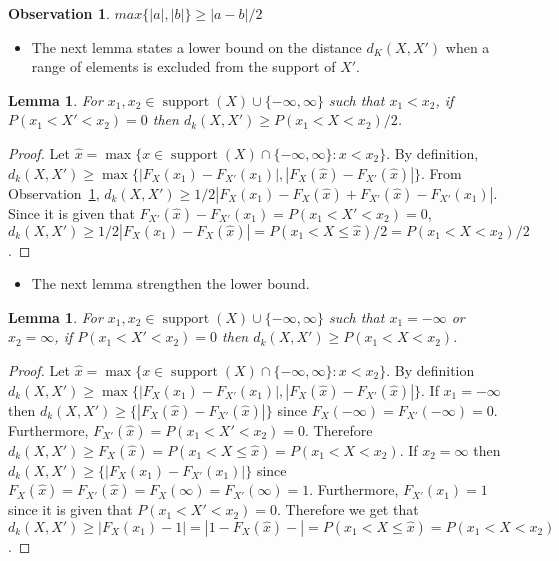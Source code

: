 \documentclass{article}
\newtheorem{lemma}[thm]{Lemma}
\newtheorem{observation}[thm]{Observation}
\DeclareMathOperator{\support}{support}
\begin{document}
\begin{observation}\label{obs:ab}
	$max\{|a|,|b|\} \geq |a-b|/2$
\end{observation}

\begin{itemize}
	\item The next lemma states a lower bound on the distance $d_K(X,X')$ when a range of elements is excluded from the support of $X'$.
\end{itemize}


\begin{lemma}\label{lem:geq}
	For $x_1, x_2 \in \support(X) \cup \{-\infty,\infty\}$ such that $x_1 < x_2$, if $P(x_1 < X' < x_2)=0$  then 
	$d_k(X,X') \geq P(x_1 < X < x_2)/2$.
\end{lemma}
\begin{proof}
	Let $\hat x=\max \{x \in \support(X) \cap\{ -\infty, \infty\}  \colon x < x_2 \}$. By definition, $d_k(X,X') \geq \max \{|F_X(x_1) - F_{X'}(x_1)|, |F_X(\hat x) - F_{X'}(\hat x)| \}$. From Observation~\ref{obs:ab}, $d_k(X,X') \geq 1/2|F_X(x_1) - F_X(\hat x) + F_{X'}(\hat x) - F_{X'}(x_1)|$. Since it is given that $F_{X'}(\hat x) - F_{X'}(x_1) = P(x_1 < X' < x_2)=0$, $d_k(X,X') \geq 1/2|F_X(x_1) - F_X(\hat x) | =  P(x_1 < X \leq \hat x)/2 = P(x_1 < X < x_2)/2$.
\end{proof}


\begin{itemize}
	\item The next lemma strengthen the lower bound.
\end{itemize}


\begin{lemma}\label{lem:geq2}
	For $x_1, x_2 \in \support(X) \cup \{-\infty,\infty\}$ such that $x_1=-\infty$ or  $x_2=\infty$, if $P(x_1 < X' < x_2)=0$  then 
	$d_k(X,X') \geq P(x_1 < X < x_2)$.
\end{lemma}
\begin{proof}
	Let $\hat x=\max \{x \in \support(X) \cap\{ -\infty, \infty\}  \colon x < x_2 \}$. By definition $d_k(X,X') \geq \max \{|F_X(x_1) - F_{X'}(x_1)|, |F_X(\hat x) - F_{X'}(\hat x)| \}$. If $x_1=-\infty$ then $d_k(X,X') \geq \{|F_X(\hat x) - F_{X'}(\hat x)| \}$ since $F_X(-\infty) = F_{X'}(-\infty) = 0$. Furthermore, $F_{X'}(\hat x) = P(x_1 < X' < x_2)=0$. Therefore $d_k(X,X') \geq F_X(\hat x) = P(x_1 < X \leq \hat x) = P(x_1 < X < x_2)$. 
	If $x_2=\infty$ then $d_k(X,X') \geq \{|F_X(x_1) - F_{X'}(x_1)| \}$ since $F_X(\hat{x}) = F_{X'}(\hat{x}) = F_X(\infty) = F_{X'}(\infty) = 1$. Furthermore, $F_{X'}(x_1) = 1$ since it is given that $P(x_1 < X' < x_2)=0$. Therefore we get that $d_k(X,X') \geq |F_X(x_1)-1| = |1-F_X(\hat x)-| = P(x_1 < X \leq \hat x) = P(x_1 < X < x_2)$.
\end{proof}
\end{document}

